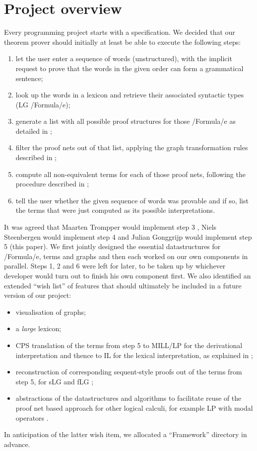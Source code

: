 \documentclass[12pt,a4paper]{article}
\begin{document}
\section{Project overview}\label{sec:project}

Every programming project starts with a specification. We decided that our theorem prover should initially at least be able to execute the following steps:
\begin{enumerate}
    \item let the user enter a sequence of words (unstructured), with the implicit request to prove that the words in the given order can form a grammatical sentence;
    \item look up the words in a lexicon and retrieve their associated syntactic types (LG \hs/Formula/e);
    \item generate a list with all possible proof structures for those \hs/Formula/e as detailed in \cite[p.~4--7]{mm12};
    \item filter the proof nets out of that list, applying the graph transformation rules described in \cite[p.~7--11]{mm12};
    \item compute all non-equivalent terms for each of those proof nets, following the procedure described in \cite[p.~21--26]{mm12};
    \item tell the user whether the given sequence of words was provable and if so, list the terms that were just computed as its possible interpretations.
\end{enumerate}
It was agreed that Maarten Trompper would implement step 3 \cite{maarten}, Niels Steenbergen would implement step 4 \cite{niels} and Julian Gonggrijp would implement step 5 (this paper). We first jointly designed the essential datastructures for \hs/Formula/e, terms and graphs and then each worked on our own components in parallel. Steps 1, 2 and 6 were left for later, to be taken up by whichever developer would turn out to finish his own component first. We also identified an extended ``wish list'' of features that should ultimately be included in a future version of our project:
\begin{itemize}
    \item visualisation of graphs;
    \item a \emph{large} lexicon;
    \item CPS translation of the terms from step 5 to MILL/LP for the derivational interpretation and thence to IL for the lexical interpretation, as explained in \cite[p.~14,19--21]{mm12};
    \item reconstruction of corresponding sequent-style proofs out of the terms from step 5, for sLG \cite[p.~3--4]{mm12} and fLG \cite[p.~15--18]{mm12};
    \item abstractions of the datastructures and algorithms to facilitate reuse of the proof net based approach for other logical calculi, for example LP with modal operators \cite{}.
\end{itemize}
In anticipation of the latter wish item, we allocated a ``Framework'' directory in advance.
\end{document}
